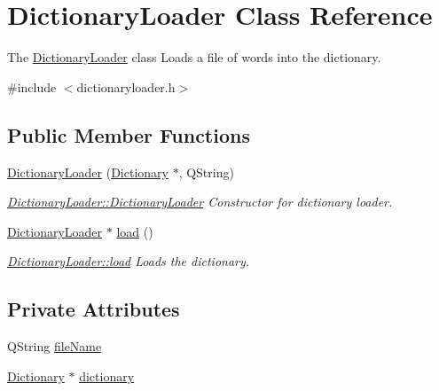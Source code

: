 \hypertarget{class_dictionary_loader}{\section{Dictionary\-Loader Class Reference}
\label{class_dictionary_loader}
}


The \hyperlink{class_dictionary_loader}{Dictionary\-Loader} class Loads a file of words into the dictionary.  




{\ttfamily \#include $<$dictionaryloader.\-h$>$}

\subsection*{Public Member Functions}
\begin{DoxyCompactItemize}
\item 
\hyperlink{class_dictionary_loader_a8724e13c20ebe2afb2ee5584aa92d436}{Dictionary\-Loader} (\hyperlink{class_dictionary}{Dictionary} $\ast$, Q\-String)
\begin{DoxyCompactList}\small\item\em \hyperlink{class_dictionary_loader_a8724e13c20ebe2afb2ee5584aa92d436}{Dictionary\-Loader\-::\-Dictionary\-Loader} Constructor for dictionary loader. \end{DoxyCompactList}\item 
\hyperlink{class_dictionary_loader}{Dictionary\-Loader} $\ast$ \hyperlink{class_dictionary_loader_a1441785d7f5a848be0d7b7f432e338f8}{load} ()
\begin{DoxyCompactList}\small\item\em \hyperlink{class_dictionary_loader_a1441785d7f5a848be0d7b7f432e338f8}{Dictionary\-Loader\-::load} Loads the dictionary. \end{DoxyCompactList}\end{DoxyCompactItemize}
\subsection*{Private Attributes}
\begin{DoxyCompactItemize}
\item 
Q\-String \hyperlink{class_dictionary_loader_ae586d429ac12873cc443f0fa68fd81e7}{file\-Name}
\item 
\hyperlink{class_dictionary}{Dictionary} $\ast$ \hyperlink{class_dictionary_loader_a8c072c045354452eb8a5d34f5936518a}{dictionary}
\end{DoxyCompactItemize}


